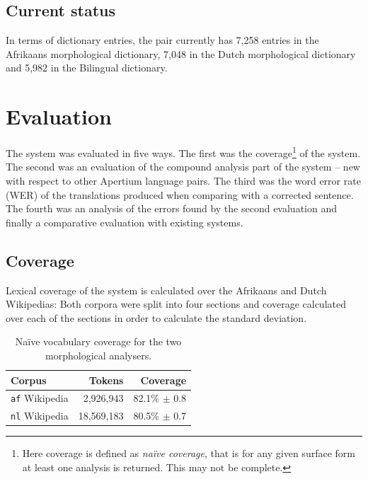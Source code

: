 \documentclass[11pt]{article}
\begin{document}
\subsection{Current status}

In terms of dictionary entries, the pair currently has 7,258 entries in the Afrikaans
morphological dictionary, 7,048 in the Dutch morphological dictionary and 5,982 in the 
Bilingual dictionary.

\section{Evaluation}

The system was evaluated in five ways. The first was the 
coverage\footnote{Here coverage is defined as \emph{na\"ive coverage}, 
that is for any given surface form at least one analysis is returned. This 
may not be complete.} of the system. The second was an evaluation of the 
compound analysis part of the system -- new with respect to other 
Apertium language pairs. The third was the word error 
rate (WER) of the translations produced when comparing with a 
corrected sentence. The fourth was an analysis of the errors found by the second
evaluation and finally a comparative evaluation with existing systems.

\subsection{Coverage}

Lexical coverage of the system is calculated over the Afrikaans and Dutch Wikipedias:
Both corpora were split into four sections and coverage calculated over each of the 
sections in order to calculate the standard deviation.

\begin{table}
  \begin{center}
  \begin{tabular}{|l|r|r|}
   \hline
   {\bf Corpus}           & {\bf Tokens}    & {\bf Coverage}\\
   \hline
   {\tt af} Wikipedia     & 2,926,943       & 82.1\% $\pm$ 0.8 \\
   \hline
   {\tt nl} Wikipedia     & 18,569,183      & 80.5\% $\pm$ 0.7 \\
   \hline
  \end{tabular}
    \caption{Na\"ive vocabulary coverage for the two morphological analysers.}
    \label{table:coverage}
  \end{center}
\end{table}
\end{document}
